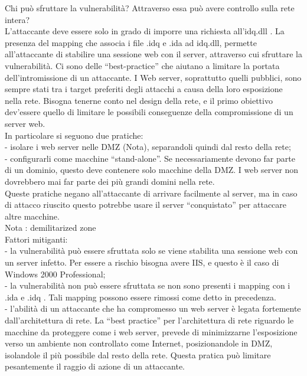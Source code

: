 Chi può sfruttare la vulnerabilità? Attraverso essa può avere controllo sulla rete intera?\\
L’attaccante deve essere solo in grado di imporre una richiesta all’idq.dll . La presenza del mapping che associa i file .idq e .ida ad idq.dll, permette all’attaccante di stabilire una sessione web con il server, attraverso cui sfruttare la vulnerabilità.
Ci sono delle “best-practice” che aiutano a limitare la portata dell’intromissione di un attaccante. I Web server, soprattutto quelli pubblici, sono sempre stati tra i target preferiti degli attacchi a causa della loro esposizione nella rete. Bisogna tenerne conto nel design della rete, e il primo obiettivo dev'essere quello di limitare le possibili conseguenze della compromissione di un server web.\\
In particolare si seguono due pratiche:\\
- isolare i web server nelle DMZ (Nota), separandoli quindi dal resto della rete;\\
- configurarli come macchine “stand-alone”. Se necessariamente devono far parte di un dominio, questo deve contenere solo macchine della DMZ. I web server non dovrebbero mai far parte dei più grandi domini nella rete.\\
Queste pratiche negano all’attaccante di arrivare facilmente al server, ma in caso di attacco riuscito questo potrebbe usare il server “conquistato” per attaccare altre macchine.\\

Nota : demilitarized zone\\

Fattori mitiganti:\\
- la vulnerabilità può essere sfruttata solo se viene stabilita una sessione web con un server infetto. Per essere a rischio bisogna avere IIS, e questo è il caso di Windows 2000 Professional;\\
- la vulnerabilità non può essere sfruttata se non sono presenti i mapping con i .ida e .idq . Tali mapping possono essere rimossi come detto in precedenza.\\
- l’abilità di un attaccante che ha compromesso un web server è legata fortemente dall’architettura di rete. La “best practice” per l’architettura di rete riguardo le macchine da proteggere come i web server, prevede di minimizzarne l’esposizione verso un ambiente non controllato come Internet, posizionandole in DMZ, isolandole il più possibile dal resto della rete. Questa pratica può limitare pesantemente il raggio di azione di un attaccante.\\

